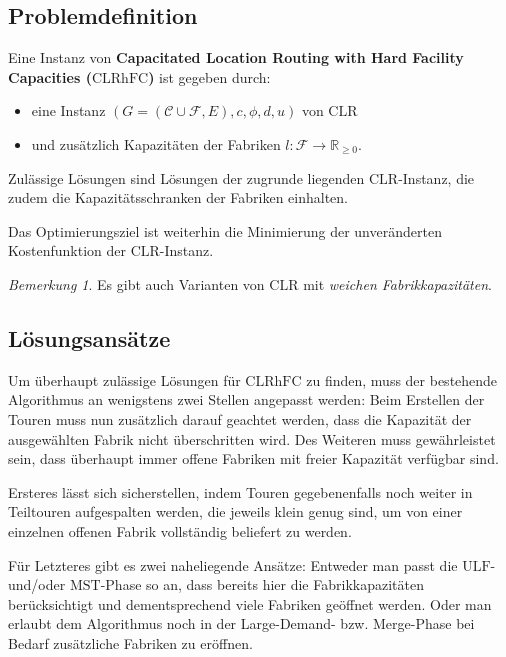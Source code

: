 \documentclass[a4paper,ngerman,12pt,bibtotoc]{scrartcl}
\theoremstyle{definition}
\theoremstyle{plain}
\theoremstyle{remark}
\newtheorem{bem}[defn]{Bemerkung}
\newcommand{\IR}{\mathbb{R}}
\newcommand{\ClientSet}{\mathscr{C}}
\newcommand{\FacilitySet}{\mathscr{F}}
\newcommand{\CLR}{\mathrm{CLR}}
\newcommand{\CLRHFC}{\mathrm{CLRhFC}}
\newcommand{\MST}{\mathrm{MST}}
\newcommand{\ULF}{\mathrm{ULF}}
\begin{document}
	\subsection{Problemdefinition}

Eine Instanz von \textbf{Capacitated Location Routing with Hard Facility Capacities ($\CLRHFC$)} ist gegeben durch:
\begin{itemize}
	\item eine Instanz $(G=(\ClientSet\cup\FacilitySet,E), c,\phi,d,u)$ von $\CLR$
	\item und zusätzlich Kapazitäten der Fabriken $l: \FacilitySet \to \IR_{\geq 0}$.
\end{itemize}
Zulässige Lösungen sind Lösungen der zugrunde liegenden $\CLR$-Instanz, die zudem die Kapazitätsschranken der Fabriken einhalten.

Das Optimierungsziel ist weiterhin die Minimierung der unveränderten Kostenfunktion der $\CLR$-Instanz.

\begin{bem}
Es gibt auch Varianten von $\CLR$ mit \emph{weichen Fabrikkapazitäten}. 

\end{bem}

	\subsection{Lösungsansätze}
	
	Um überhaupt zulässige Lösungen für $\CLRHFC$ zu finden, muss der bestehende Algorithmus an wenigstens zwei Stellen angepasst werden: Beim Erstellen der Touren muss nun zusätzlich darauf geachtet werden, dass die Kapazität der ausgewählten Fabrik nicht überschritten wird. Des Weiteren muss gewährleistet sein, dass überhaupt immer offene Fabriken mit freier Kapazität verfügbar sind.
	
	Ersteres lässt sich sicherstellen, indem Touren gegebenenfalls noch weiter in Teiltouren aufgespalten werden, die jeweils klein genug sind, um von einer einzelnen offenen Fabrik vollständig beliefert zu werden.
	
	Für Letzteres gibt es zwei naheliegende Ansätze: Entweder man passt die $\ULF$- und/oder $\MST$-Phase so an, dass bereits hier die Fabrikkapazitäten berücksichtigt und dementsprechend viele Fabriken geöffnet werden. Oder man erlaubt dem Algorithmus noch in der Large-Demand- bzw. Merge-Phase bei Bedarf zusätzliche Fabriken zu eröffnen. 
	
\end{document}

